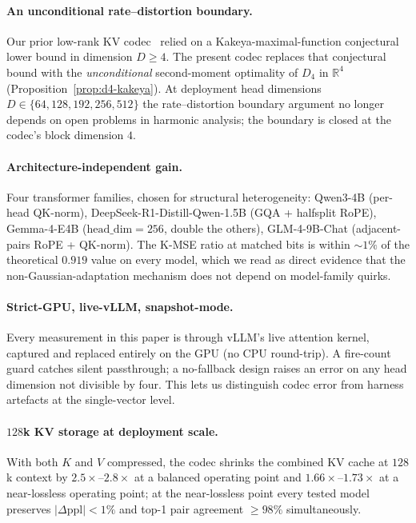 \documentclass[11pt,a4paper]{article}
\theoremstyle{definition}
\theoremstyle{plain}
\newcommand{\R}{\mathbb{R}}
\newcommand{\abs}[1]{\left\lvert#1\right\rvert}
\begin{document}
\paragraph{An unconditional rate--distortion boundary.}
Our prior low-rank KV codec~\cite{kakeya-v13-paper} relied on a
Kakeya-maximal-function conjectural lower bound in dimension
$D\geq 4$. The present codec replaces that conjectural bound with
the \emph{unconditional} second-moment optimality of $D_4$ in $\R^4$
(Proposition~\ref{prop:d4-kakeya}). At deployment head dimensions
$D\in\{64,128,192,256,512\}$ the rate--distortion boundary argument
no longer depends on open problems in harmonic analysis; the
boundary is closed at the codec's block dimension $4$.

\paragraph{Architecture-independent gain.}
Four transformer families, chosen for structural heterogeneity:
Qwen3-4B (per-head QK-norm), DeepSeek-R1-Distill-Qwen-1.5B (GQA
+ halfsplit RoPE), Gemma-4-E4B ($\text{head\_dim}=256$, double the
others), GLM-4-9B-Chat (adjacent-pairs RoPE + QK-norm). The K-MSE
ratio at matched bits is within $\sim\!1\%$ of the theoretical
$0.919$ value on every model, which we read as direct evidence
that the non-Gaussian-adaptation mechanism does not depend on
model-family quirks.

\paragraph{Strict-GPU, live-vLLM, snapshot-mode.}
Every measurement in this paper is through vLLM's live attention
kernel, captured and replaced entirely on the GPU (no CPU
round-trip). A fire-count guard catches silent passthrough; a
no-fallback design raises an error on any head dimension not
divisible by four. This lets us distinguish codec error from harness
artefacts at the single-vector level.

\paragraph{$128$k KV storage at deployment scale.}
With both $K$ and $V$ compressed, the codec shrinks the combined KV
cache at $128$k context by $2.5\times$--$2.8\times$ at a balanced
operating point and $1.66\times$--$1.73\times$ at a near-lossless
operating point; at the near-lossless point every tested model
preserves $\abs{\Delta\mathrm{ppl}} < 1\%$ and top-1 pair agreement
$\geq 98\%$ simultaneously.
\end{document}
